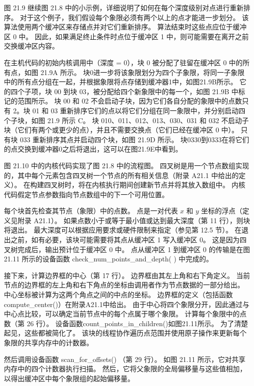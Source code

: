 图 21.9 继续图 21.8 中的小示例，详细说明了如何在每个深度级别对点进行重新排序。 对于这个例子，我们假设每个象限必须有两个以上的点才能进一步划分。 该算法使用两个缓冲区来存储点并对它们重新排序。 算法结束时这些点应位于缓冲区 0 中。 因此，如果满足终止条件时点位于缓冲区 1 中，则可能需要在离开之前交换缓冲区内容。

在主机代码的初始内核调用中（深度 = 0），块 0 被分配了驻留在缓冲区 0 中的所有点，如图 21.9A 所示。 块0进一步将该象限划分为四个子象限，将同一子象限中的所有点分组在一起，并根据象限将点存储到缓冲器1中，如图21.9B所示。 它的四个子项，块 00 到块 03，被分配给四个新象限中的每一个，如图 21.9B 中标记的范围所示。 块 00 和 02 不会启动子块，因为它们各自分配的象限中的点数只有 2。块 01 和 03 重新排序它们的点以将它们分组在同一象限中，并分别启动四个子块，如图 21.9 所示 C。 块 010、011、012、013、030、031 和 032 不启动子块（它们有两个或更少的点），并且不需要交换点（它们已经在缓冲区 0 中）。 只有块 033 重新排序其点并启动四个块，如图 21.9D 所示。 块0330到0333在将它们的点交换到缓冲器0之后将退出，这可以在图21.9E中看到。

图 21.10 中的内核代码实现了图 21.8 中的流程图。 四叉树是用一个节点数组实现的，其中每个元素包含四叉树一个节点的所有相关信息（附录 A21.1 中给出的定义）。 在构建四叉树时，将在内核执行期间创建新节点并将其放入数组中。 内核代码假定节点参数指向节点数组中的下一个可用位置。

每个块首先检查其节点（象限）中的点数。 点是一对代表 $x$ 和 $y$ 坐标的浮点（定义见附录 A21.1）。 如果点数小于或等于最小值或达到最大深度（第 11 行），则块将退出。 最大深度可以根据应用要求或硬件限制来指定（参见第 12.5 节）。 在退出之前，如有必要，该块可能需要将其点从缓冲区 1 写入缓冲区 0。 这是因为四叉树完成后，输出预计位于缓冲区 0 中。 点从缓冲区 1 到缓冲区 0 的传输是在图 21.11 所示的设备函数 check\_num\_points\_and\_depth( ) 中完成的。

接下来，计算边界框的中心（第 17 行）。 边界框由其左上角和右下角定义。 当前节点的边界框的左上角和右下角点的坐标由调用者作为节点数据的一部分给出。 中心坐标被计算为这两个角点之间的中点的坐标。 边界框的定义（包括函数compute\_center()）在附录A21.1中给出。 由于中心将四个象限分开，因此通过与中心点比较，可以确定当前节点中的每个点属于哪个象限。 计算每个象限中的点数（第 26 行）。 设备函数count\_points\_in\_children()如图21.11所示。 为了清楚起见，这些都被简化了。 该块的线程协作遍历点范围并使用原子操作来更新每个象限的共享内存中的计数器。

然后调用设备函数 scan\_for\_offsets() （第 29 行）。 如图 21.11 所示，它对共享内存中的四个计数器执行扫描。 然后，它将父象限的全局偏移量与这些值相加，以得出缓冲区中每个象限组的起始偏移量。

